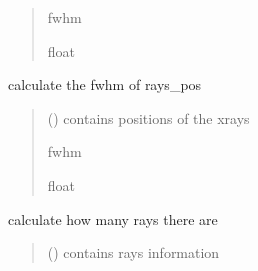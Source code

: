 \documentclass[letterpaper,10pt,english]{sphinxmanual}
\begin{document}
\begin{fulllineitems}
\begin{fulllineitems}
\begin{quote}
\begin{description}
\sphinxAtStartPar
fwhm

\sphinxAtStartPar
float

\end{description}\end{quote}

\end{fulllineitems}


\begin{fulllineitems}
\label{\detokenize{index:raypyng.postprocessing.PostProcess._extract_focus_fwhm}}
\pysigstartsignatures
{}
\pysigstopsignatures
\sphinxAtStartPar
calculate the fwhm of rays\_pos
\begin{quote}\begin{description}
\sphinxAtStartPar
{} () \textendash{} contains positions of the x\sphinxhyphen{}rays

\sphinxAtStartPar
fwhm

\sphinxAtStartPar
float

\end{description}\end{quote}

\end{fulllineitems}


\begin{fulllineitems}
\label{\detokenize{index:raypyng.postprocessing.PostProcess._extract_intensity}}
\pysigstartsignatures
{}
\pysigstopsignatures
\sphinxAtStartPar
calculate how many rays there are
\begin{quote}\begin{description}
\sphinxAtStartPar
{} () \textendash{} contains rays information


\end{description}
\end{quote}
\end{fulllineitems}
\end{fulllineitems}
\end{document}
